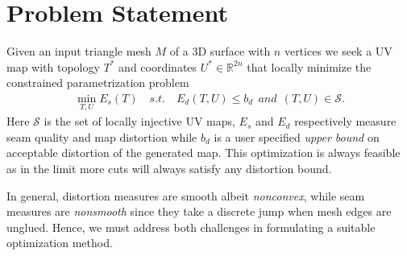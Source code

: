 
\section{Problem Statement}

Given an input triangle mesh $M$ of a 3D surface with $n$ vertices we seek a UV map with topology $T^*$ and coordinates $U^* \in \mathbb{R}^{2n}$ that locally minimize %
the constrained parametrization problem
\begin{align}
	\min_{T,U} E_s(T) \quad s.t. \quad E_d(T,U) \leq b_d\ \ and\ \ (T, U) \in \mathcal{S}.
	\label{eq:p1}
\end{align}
 
%
Here $\mathcal{S}$ is the set of locally injective UV maps, $E_s$ and $E_d$ respectively measure seam quality and map distortion while $b_d$ is a user specified \emph{upper bound} on acceptable distortion of the generated map. This optimization is always feasible as in the limit more cuts will always satisfy any  distortion bound. %

In general, distortion measures are smooth albeit \emph{nonconvex}, while seam measures are \emph{nonsmooth} since they take a discrete jump when mesh edges are unglued.  Hence, we must address both challenges in formulating a suitable optimization method. 

%

